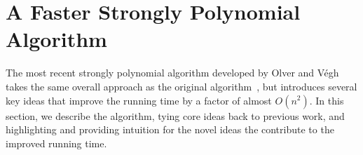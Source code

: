 \documentclass[11pt]{article}
\theoremstyle{definition}
\theoremstyle{definition}
\theoremstyle{definition}
\newcommand{\tf}{\textsc{Tight-Flow}}
\newcommand{\filtration}{\textsc{Filtration}}
\renewcommand{\todo}[1]{\hl{TODO: #1}}
\begin{document}
	
    
	


\section{A Faster Strongly Polynomial Algorithm}\label{sec:2017}

The most recent strongly polynomial algorithm developed by Olver and Végh \cite{Olver2017} takes the same overall approach as the original algorithm~\cite{Vegh2013}, but introduces several key ideas that improve the running time by a factor of almost $O(n^2)$. 
In this section, we describe the algorithm, tying core ideas back to previous work, and highlighting and providing intuition for the novel ideas the contribute to the improved running time. 
\end{document}
